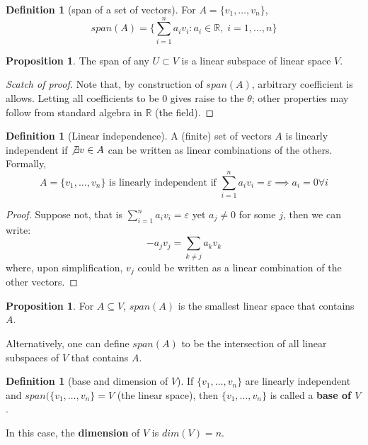 \documentclass[12pt]{article}
\newcommand{\R}{{\mathbb R}}
\theoremstyle{definition}
\newtheorem{definition}[theorem]{Definition}
\newtheorem{proposition}[theorem]{Proposition}
\theoremstyle{plain}
\begin{document}
\begin{definition}
    [span of a set of vectors] For $A = \{ v_1, \ldots, v_n\}$,
    \[
        span(A) = \{ \sum_{i=1}^n a_i v_i : a_i \in \R, \; i = 1, \ldots, n\}
    \]
\end{definition}

\begin{proposition}
    The span of any $U\subset V$ is a linear subspace of linear space $V$.
\end{proposition}
\begin{proof}[Scatch of proof]
    Note that, by construction of $span(A)$, arbitrary coefficient is allows.
    Letting all coefficients to be $0$ gives raise to the $\theta$; other
    properties may follow from standard algebra in $\R$ (the field).
\end{proof}

\begin{definition}
    [Linear independence]

    A (finite) set of vectors $A$ is linearly independent if $\not\exists v \in A$ can be
    written as linear combinations of the others. Formally,
    \[
        A = \{ v_1, \ldots, v_n \} \text{ is linearly independent if }
        \sum_{i=1}^n a_i v_i = \varepsilon \implies a_i = 0 \forall i
    \]
    \begin{proof}
        Suppose not, that is $\sum_{i=1}^n a_i v_i = \varepsilon$ yet $a_j \not=
        0$ for some $j$, then we can write:
        \[
            -a_j v_j = \sum_{k\not=j} a_k v_k
        \]
        where, upon simplification, $v_j$ could be written as a linear
        combination of the other vectors.
    \end{proof}
\end{definition}

\begin{proposition}
    For $A \subseteq V$, $span(A)$ is the smallest linear space that contains
    $A$.

    Alternatively, one can define $span(A)$ to be the intersection of all linear
    subspaces of $V$ that contains $A$.
\end{proposition}

\begin{definition}
    [base and dimension of $V$]
    If $\{v_1, \ldots, v_n\}$ are linearly independent and $span(\{v_1, \ldots,
        v_n\} = V$ (the linear space), then $\{v_1,\ldots, v_n\}$ is called a
        \textbf{base of $V$}.

        In this case, the \textbf{dimension} of $V$ is $dim(V) = n$.
\end{definition}
\end{document}
